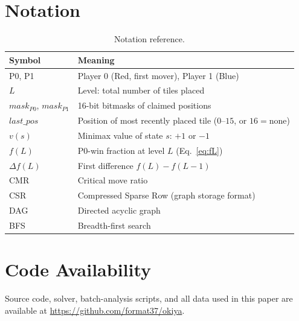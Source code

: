 \documentclass[11pt,a4paper]{article}
\begin{document}
\section{Notation}\label{app:notation}

\begin{table}[ht]
\centering
\caption{Notation reference.}
\begin{tabular}{@{}ll@{}}
\toprule
Symbol & Meaning\\
\midrule
P0, P1 & Player 0 (Red, first mover), Player 1 (Blue)\\
$L$ & Level: total number of tiles placed\\
$\mathit{mask}_{P0}$, $\mathit{mask}_{P1}$ & 16-bit bitmasks of claimed positions\\
$\mathit{last\_pos}$ & Position of most recently placed tile ($0$--$15$, or $16{=}$none)\\
$v(s)$ & Minimax value of state $s$: $+1$ or $-1$\\
$f(L)$ & P0-win fraction at level $L$ (Eq.~\ref{eq:fL})\\
$\Delta f(L)$ & First difference $f(L) - f(L{-}1)$\\
CMR & Critical move ratio\\
CSR & Compressed Sparse Row (graph storage format)\\
DAG & Directed acyclic graph\\
BFS & Breadth-first search\\
\bottomrule
\end{tabular}
\end{table}

\section*{Code Availability}

Source code, solver, batch-analysis scripts, and all data used in this paper
are available at
\url{https://github.com/format37/okiya}.
\end{document}
